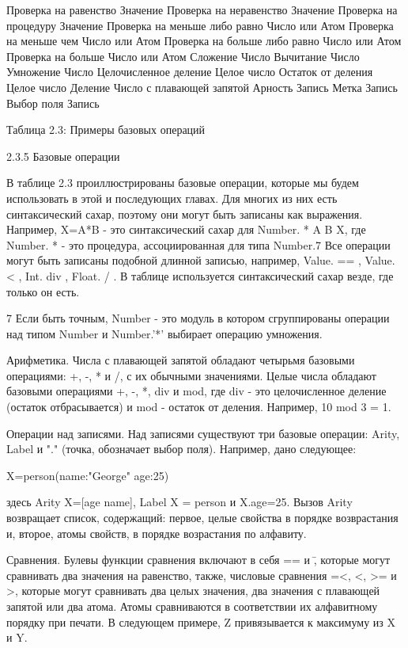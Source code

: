 Проверка на равенство Значение
Проверка на неравенство Значение
Проверка на процедуру Значение
Проверка на меньше либо равно Число или Атом
Проверка на меньше чем Число или Атом
Проверка на больше либо равно Число или Атом
Проверка на больше Число или Атом
Сложение Число
Вычитание Число
Умножение Число
Целочисленное деление Целое число
Остаток от деления Целое число
Деление Число с плавающей запятой
Арность Запись
Метка Запись
Выбор поля Запись

Таблица 2.3: Примеры базовых операций

2.3.5 Базовые операции

В таблице 2.3 проиллюстрированы базовые операции, которые мы будем использовать в этой и последующих главах. Для многих из них есть синтаксический сахар, поэтому они могут быть записаны как выражения. Например, X=A*B - это синтаксический сахар для  {Number. * A B X}, где  Number. *  - это процедура, ассоциированная для типа Number.7 Все операции могут быть записаны подобной длинной записью, например,  Value. == , Value. < , Int. div , Float. / . В таблице используется синтаксический сахар везде, где только он есть.

7 Если быть точным, Number - это модуль в котором сгруппированы операции над типом Number и Number.'*' выбирает операцию умножения.

Арифметика. Числа с плавающей запятой обладают четырьмя базовыми операциями: +, -, * и /, с их обычными значениями. Целые числа обладают базовыми операциями +, -, *, div и mod, где div - это целочисленное деление (остаток отбрасывается) и mod - остаток от деления. Например, 10 mod 3 = 1.

Операции над записями. Над записями существуют три базовые операции: Arity, Label и "." (точка, обозначает выбор поля). Например, дано следующее:

X=person(name:"George" age:25)

здесь {Arity X}=[age name], {Label X} = person и X.age=25. Вызов Arity возвращает список, содержащий: первое, целые свойства в порядке возврастания и, второе, атомы свойств, в порядке возрастания по алфавиту.

Сравнения. Булевы функции сравнения включают в себя == и \=, которые могут сравнивать два значения на равенство, также, числовые сравнения =<, <, >= и >, которые могут сравнивать два целых значения, два значения с плавающей запятой или два атома. Атомы сравниваются в соответствии их алфавитному порядку при печати. В следующем примере, Z привязывается к максимуму из X и Y.

